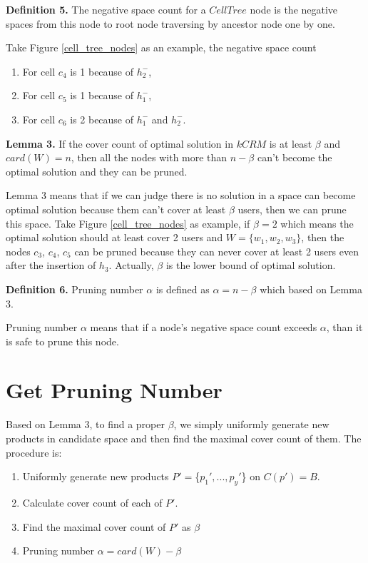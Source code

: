  
{\bfseries Definition 5.} The negative space count for a $CellTree$ node is the 
negative spaces from this node to root node traversing by ancestor node one by one.

Take Figure \ref{cell_tree_nodes} as an example, the negative space count
\begin{enumerate}
\item For cell $c_4$ is 1 because of $h_2^-$,
\item For cell $c_5$ is 1 because of $h_1^-$, 
\item For cell $c_6$ is 2 because of $h_1^-$ and $h_2^-$.
\end{enumerate}

{\bfseries Lemma 3.} If the cover count of optimal solution in $kCRM$ is at least 
$\beta $ and $card(W)=n$, then all the 
nodes with more than $n-\beta $  can't become the optimal solution and they can 
be pruned.

Lemma 3 means that if we can judge there is no solution in a space can become 
optimal solution because them can't cover at least $\beta$ users, then we can 
prune this space. Take Figure \ref{cell_tree_nodes} as example, if $\beta=2$ 
which means the optimal solution should at least cover 2 users 
and $W=\{w_1, w_2, w_3\}$, then the nodes $c_3$, $c_4$, $c_5$ can be pruned 
because they can never cover at least 2 users even after the insertion of 
$h_3$. Actually, $\beta$ is the lower bound of optimal solution.

{\bfseries Definition 6.} Pruning number $\alpha $ is defined as $\alpha = n-\beta $ 
which based on Lemma 3.

Pruning number $\alpha$ means that if a node's negative space count exceeds 
$\alpha$, than it is safe to prune this node.

\section{Get Pruning Number}
Based on Lemma 3, to find a proper $\beta$, we simply uniformly generate new 
products 
in candidate space and then find the maximal cover count of them.
The procedure is:
\begin{enumerate}
\item Uniformly generate new products $P'=$\{$p_{1}', ..., p_{y}'$\} on $C(p')=B$.
\item Calculate cover count of each of $P'$.
\item Find the maximal cover count of $P'$ as $\beta$
\item Pruning number $\alpha=card(W)-\beta$ 
\end{enumerate}



